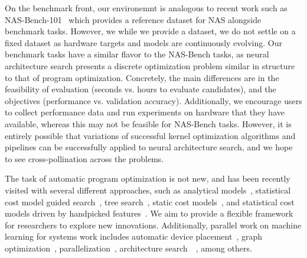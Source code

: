 On the benchmark front, our environemnt is analogous to recent work such as NAS-Bench-101~\cite{pmlr-v97-ying19a} which provides a reference dataset for NAS alongside benchmark tasks.
However, we while we provide a dataset, we do not settle on a fixed dataset as hardware targets and models are continuously evolving.
Our benchmark tasks have a similar flavor to the NAS-Bench tasks, as neural architecture search presents a discrete optimization problem similar in structure to that of program optimization.
Concretely, the main differences are in the feasibility of evaluation (seconds vs. hours to evaluate candidates), and the objectives (performance vs. validation accuracy).
Additionally, we encourage users to collect performance data and run experiments on hardware that they have available, whereas this may not be feasible for NAS-Bench tasks.
However, it is entirely possible that variations of successful kernel optimization algorithms and pipelines can be successfully applied to neural architecture search, and we hope to see cross-pollination across the problems.


The task of automatic program optimization is not new, and has been recently visited with several different approaches, such as analytical models~\cite{mullapudi2016automatically}, statistical cost model guided search~\cite{NIPS2018_7599}, tree search~\cite{Adams2019LearningTO}, static cost models~\cite{Kim:2019:CGH:3314872.3314885}, and statistical cost models driven by handpicked features~\cite{Li:2018:DPI}.
We aim to provide a flexible framework for researchers to explore new innovations.
Additionally, parallel work on machine learning for systems work includes automatic device placement~\cite{mirhoseini2017device}, graph optimization~\cite{metaflow_sysml19}, parallelization~\cite{soap_sysml19}, architecture search~\cite{tan2019mnasnet}~\cite{zoph2018learning}, among others. 

